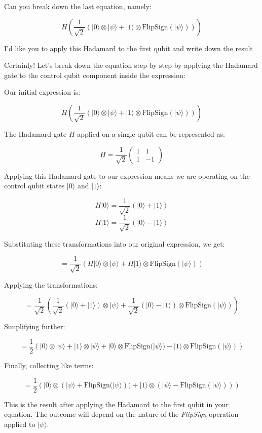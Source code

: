 \begin{ai}
Can you break down the last equation, namely:

\[
H \left(\dfrac{1}{\sqrt{2}}(|0\rangle \otimes |\psi\rangle + |1\rangle \otimes
\text{FlipSign}(|\psi\rangle))\right)
\]

I'd like you to apply this Hadamard to the first qubit and write down the result
\end{ai}

\begin{airesult}
Certainly! Let's break down the equation step by step by applying the Hadamard gate to the control
qubit component inside the expression:

\vsp

Our initial expression is:

\[
H \left(\dfrac{1}{\sqrt{2}} \left( |0\rangle \otimes |\psi\rangle + |1\rangle \otimes
\text{FlipSign}(|\psi\rangle) \right) \right)
\]

The Hadamard gate \( H \) applied on a single qubit can be represented as:

\[
H = \dfrac{1}{\sqrt{2}} \begin{pmatrix} 1 & 1 \\ 1 & -1 \end{pmatrix}
\]

Applying this Hadamard gate to our expression means we are operating on the control qubit states
\(|0\rangle\) and \(|1\rangle\):

\[
H |0\rangle = \dfrac{1}{\sqrt{2}} (|0\rangle + |1\rangle)
\]
\[
H |1\rangle = \dfrac{1}{\sqrt{2}} (|0\rangle - |1\rangle)
\]

Substituting these transformations into our original expression, we get:

\[
= \dfrac{1}{\sqrt{2}} \left( H|0\rangle \otimes |\psi\rangle + H|1\rangle \otimes
\text{FlipSign}(|\psi\rangle) \right)
\]

Applying the transformations:

\[
= \dfrac{1}{\sqrt{2}} \left( \dfrac{1}{\sqrt{2}} (|0\rangle + |1\rangle) \otimes |\psi\rangle
+ \dfrac{1}{\sqrt{2}} (|0\rangle - |1\rangle) \otimes \text{FlipSign}(|\psi\rangle) \right)
\]

Simplifying further:

\[
= \dfrac{1}{2} \left( |0\rangle \otimes |\psi\rangle + |1\rangle \otimes |\psi\rangle
+ |0\rangle \otimes \text{FlipSign}(|\psi\rangle) - |1\rangle \otimes \text{FlipSign}(|\psi\rangle)
\right)
\]

Finally, collecting like terms:

\[
= \dfrac{1}{2} \left( |0\rangle \otimes (|\psi\rangle + \text{FlipSign}(|\psi\rangle))
+ |1\rangle \otimes (|\psi\rangle - \text{FlipSign}(|\psi\rangle)) \right)
\]

This is the result after applying the Hadamard to the first qubit in your equation. The outcome will
depend on the nature of the \textit{FlipSign} operation applied to \(|\psi\rangle\).
\end{airesult}

